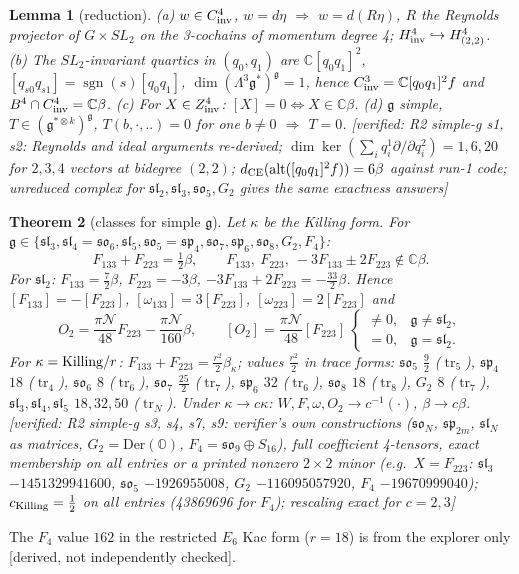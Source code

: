 \documentclass[10pt,a4paper]{article}
\numberwithin{equation}{section}
\newtheorem{theorem}{Theorem}[section]
\newtheorem{lemma}[theorem]{Lemma}
\theoremstyle{definition}
\theoremstyle{remark}
\newcommand{\tr}{\operatorname{tr}}
\newcommand{\alt}{\operatorname{alt}}
\newcommand{\sgn}{\operatorname{sgn}}
\newcommand{\g}{\mathfrak g}
\newcommand{\fsl}{\mathfrak{sl}}
\newcommand{\fso}{\mathfrak{so}}
\newcommand{\fsp}{\mathfrak{sp}}
\newcommand{\cN}{\mathcal N}
\newcommand{\ver}[1]{\textup{[verified: #1]}}
\newcommand{\der}{\textup{[derived, not independently checked]}}
\begin{document}
\begin{lemma}[reduction]\label{lem-red}
(a) $w\in C^4_{\rm inv}$, $w=d\eta$ $\Rightarrow$ $w=d(R\eta)$, $R$ the Reynolds projector of $G\times SL_2$ on the 3-cochains of momentum degree 4; $H^4_{\rm inv}\hookrightarrow H^4_{(2,2)}$. (b) The $SL_2$-invariant quartics in $(q_0,q_1)$ are $\mathbb C[q_0q_1]^2$, $[q_{s0}q_{s1}]=\sgn(s)[q_0q_1]$, $\dim(\Lambda^3\g^*)^\g=1$, hence $C^3_{\rm inv}=\mathbb C[q_0q_1]^2f$ and $B^4\cap C^4_{\rm inv}=\mathbb C\beta$. (c) For $X\in Z^4_{\rm inv}$: $[X]=0\iff X\in\mathbb C\beta$. (d) $\g$ simple, $T\in(\g^{*\otimes k})^\g$, $T(b,\cdot,..)=0$ for one $b\ne0$ $\Rightarrow$ $T=0$.
\ver{R2 simple-g s1, s2: Reynolds and ideal arguments re-derived; $\dim\ker(\sum_iq_i^1\partial/\partial q_i^2)=1,6,20$ for $2,3,4$ vectors at bidegree $(2,2)$; $d_{\rm CE}(\alt([q_0q_1]^2f))=6\beta$ against run-1 code; unreduced complex for $\fsl_2,\fsl_3,\fso_5,G_2$ gives the same exactness answers}
\end{lemma}

\begin{theorem}[classes for simple $\g$]\label{thm-simple}
Let $\kappa$ be the Killing form. For $\g\in\{\fsl_3,\fsl_4=\fso_6,\fsl_5,\fso_5=\fsp_4,\fso_7,\fsp_6,\fso_8,G_2,F_4\}$:
\begin{equation}
F_{133}+F_{223}=\tfrac12\beta,\qquad F_{133},\ F_{223},\ -3F_{133}\pm2F_{223}\notin\mathbb C\beta .
\end{equation}
For $\fsl_2$: $F_{133}=\frac72\beta$, $F_{223}=-3\beta$, $-3F_{133}+2F_{223}=-\frac{33}2\beta$. Hence $[F_{133}]=-[F_{223}]$, $[\omega_{133}]=3[F_{223}]$, $[\omega_{223}]=2[F_{223}]$ and
\begin{equation}
O_2=\frac{\pi\cN}{48}F_{223}-\frac{\pi\cN}{160}\beta,\qquad [O_2]=\frac{\pi\cN}{48}[F_{223}]\ \begin{cases}\neq0,&\g\neq\fsl_2,\\=0,&\g=\fsl_2.\end{cases}
\end{equation}
For $\kappa={\rm Killing}/r$: $F_{133}+F_{223}=\frac{r^2}2\beta_\kappa$; values $\frac{r^2}{2}$ in trace forms: $\fso_5$ $\frac92$ ($\tr_5$), $\fsp_4$ $18$ ($\tr_4$), $\fso_6$ $8$ ($\tr_6$), $\fso_7$ $\frac{25}2$ ($\tr_7$), $\fsp_6$ $32$ ($\tr_6$), $\fso_8$ $18$ ($\tr_8$), $G_2$ $8$ ($\tr_7$), $\fsl_3,\fsl_4,\fsl_5$ $18,32,50$ ($\tr_N$). Under $\kappa\to c\kappa$: $W,F,\omega,O_2\to c^{-1}(\cdot)$, $\beta\to c\beta$.
\ver{R2 simple-g s3, s4, s7, s9: verifier's own constructions ($\fso_N$, $\fsp_{2m}$, $\fsl_N$ as matrices, $G_2=\mathrm{Der}(\mathbb O)$, $F_4=\fso_9\oplus S_{16}$), full coefficient 4-tensors, exact membership on all entries or a printed nonzero $2\times2$ minor (e.g.\ $X=F_{223}$: $\fsl_3$ $-1451329941600$, $\fso_5$ $-1926955008$, $G_2$ $-116095057920$, $F_4$ $-19670999040$); $c_{\rm Killing}=\frac12$ on all entries (43869696 for $F_4$); rescaling exact for $c=2,3$}
\end{theorem}
The $F_4$ value $162$ in the restricted $E_6$ Kac form ($r=18$) is from the explorer only \der.
\end{document}

